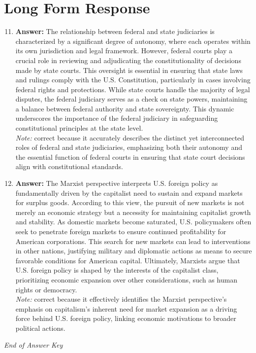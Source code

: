 \documentclass[12pt]{article}
\begin{document}
\section*{Long Form Response}
\begin{enumerate}[label=\arabic*.]
\setcounter{enumi}{10}
\item \textbf{Answer:} The relationship between federal and state judiciaries is characterized by a significant degree of autonomy, where each operates within its own jurisdiction and legal framework. However, federal courts play a crucial role in reviewing and adjudicating the constitutionality of decisions made by state courts. This oversight is essential in ensuring that state laws and rulings comply with the U.S. Constitution, particularly in cases involving federal rights and protections. While state courts handle the majority of legal disputes, the federal judiciary serves as a check on state powers, maintaining a balance between federal authority and state sovereignty. This dynamic underscores the importance of the federal judiciary in safeguarding constitutional principles at the state level.
\\ \textit{Note:} correct because it accurately describes the distinct yet interconnected roles of federal and state judiciaries, emphasizing both their autonomy and the essential function of federal courts in ensuring that state court decisions align with constitutional standards.
\item \textbf{Answer:} The Marxist perspective interprets U.S. foreign policy as fundamentally driven by the capitalist need to sustain and expand markets for surplus goods. According to this view, the pursuit of new markets is not merely an economic strategy but a necessity for maintaining capitalist growth and stability. As domestic markets become saturated, U.S. policymakers often seek to penetrate foreign markets to ensure continued profitability for American corporations. This search for new markets can lead to interventions in other nations, justifying military and diplomatic actions as means to secure favorable conditions for American capital. Ultimately, Marxists argue that U.S. foreign policy is shaped by the interests of the capitalist class, prioritizing economic expansion over other considerations, such as human rights or democracy.
\\ \textit{Note:} correct because it effectively identifies the Marxist perspective's emphasis on capitalism's inherent need for market expansion as a driving force behind U.S. foreign policy, linking economic motivations to broader political actions.
\end{enumerate}

\vfill
\noindent\textit{End of Answer Key}
\end{document}
